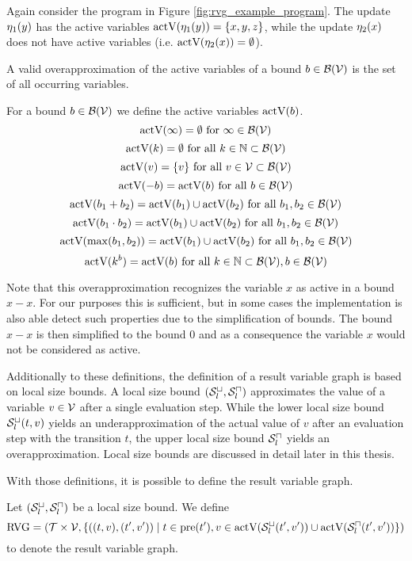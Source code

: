 Again consider the program in Figure \ref{fig:rvg_example_program}.
The update $\eta_1(y)$ has the active variables $\text{actV}(\eta_1(y)) = \lbrace x,y,z \rbrace$, while the update $\eta_2(x)$ does not have active variables (i.e. $\text{actV}(\eta_2(x)) = \emptyset$).

A valid overapproximation of the active variables of a bound $b \in \mathcal{B}(\mathcal{V})$ is the set of all occurring variables.
\begin{definition}
  For a bound $b \in \mathcal{B}(\mathcal{V})$ we define the active variables $\text{actV}(b)$.
  \[ \text{actV}(\infty) = \emptyset \text{ for } \infty \in \mathcal{B}(\mathcal{V}) \]
  \[ \text{actV}(k) = \emptyset \text{ for all } k \in \mathbb{N} \subset \mathcal{B}(\mathcal{V}) \] 
  \[ \text{actV}(v) = \lbrace v \rbrace \text{ for all } v \in \mathcal{V} \subset \mathcal{B}(\mathcal{V}) \] 
  \[ \text{actV}(-b) = \text{actV}(b) \text{ for all } b \in \mathcal{B}(\mathcal{V}) \] 
  \[ \text{actV}(b_1 + b_2) = \text{actV}(b_1) \cup \text{actV}(b_2) \text{ for all } b_1, b_2 \in \mathcal{B}(\mathcal{V}) \] 
  \[ \text{actV}(b_1 \cdot b_2) = \text{actV}(b_1) \cup \text{actV}(b_2) \text{ for all } b_1, b_2 \in \mathcal{B}(\mathcal{V}) \] 
  \[ \text{actV}(\max(b_1, b_2)) = \text{actV}(b_1) \cup \text{actV}(b_2) \text{ for all } b_1, b_2 \in \mathcal{B}(\mathcal{V}) \]
  \[ \text{actV}(k^b) = \text{actV}(b) \text{ for all } k \in \mathbb{N} \subset \mathcal{B}(\mathcal{V}), b \in \mathcal{B}(\mathcal{V}) \]  
\end{definition}

Note that this overapproximation recognizes the variable $x$ as active in a bound $x - x$.
For our purposes this is sufficient, but in some cases the implementation is also able detect such properties due to the simplification of bounds.
The bound $x - x$ is then simplified to the bound $0$ and as a consequence the variable $x$ would not be considered as active.

Additionally to these definitions, the definition of a result variable graph is based on local size bounds.
A local size bound ${({\mathcal{S}^\sqcup_l}, {\mathcal{S}^\sqcap_l})}$ approximates the value of a variable $v \in \mathcal{V}$ after a single evaluation step.
While the lower local size bound ${\mathcal{S}^\sqcup_l}(t,v)$ yields an underapproximation of the actual value of $v$ after an evaluation step with the transition $t$, the upper local size bound ${\mathcal{S}^\sqcap_l}$ yields an overapproximation.
Local size bounds are discussed in detail later in this thesis.

With those definitions, it is possible to define the result variable graph.

\begin{definition}
  Let ${({\mathcal{S}^\sqcup_l}, {\mathcal{S}^\sqcap_l})}$ be a local size bound.
  We define 
  \[ \text{RVG} = (\mathcal{T} \times \mathcal{V}, \lbrace ((t, v), (t', v')) \mid t \in \text{pre}(t'), v \in \text{actV}({\mathcal{S}^\sqcup_l}(t',v')) \cup \text{actV}({\mathcal{S}^\sqcap_l}(t',v')) \rbrace) \]
  to denote the result variable graph.
\end{definition}

